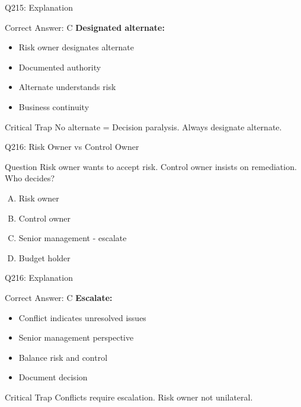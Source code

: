 \documentclass{beamer}
\begin{document}
	\begin{frame}{Q215: Explanation}
		\begin{block}{Correct Answer: C}
			\textbf{Designated alternate:}
			\begin{itemize}
				\item Risk owner designates alternate
				\item Documented authority
				\item Alternate understands risk
				\item Business continuity
			\end{itemize}
		\end{block}
		\begin{alertblock}{Critical Trap}
			No alternate = Decision paralysis.
			Always designate alternate.
		\end{alertblock}
	\end{frame}
	
	\begin{frame}{Q216: Risk Owner vs Control Owner}
		\begin{block}{Question}
			Risk owner wants to accept risk. Control owner insists on remediation. Who decides?
		\end{block}
		\begin{enumerate}[(A)]
			\item Risk owner
			\item Control owner
			\item Senior management - escalate
			\item Budget holder
		\end{enumerate}
	\end{frame}
	
	\begin{frame}{Q216: Explanation}
		\begin{block}{Correct Answer: C}
			\textbf{Escalate:}
			\begin{itemize}
				\item Conflict indicates unresolved issues
				\item Senior management perspective
				\item Balance risk and control
				\item Document decision
			\end{itemize}
		\end{block}
		\begin{alertblock}{Critical Trap}
			Conflicts require escalation.
			Risk owner not unilateral.
		\end{alertblock}
	\end{frame}
	
\end{document}
